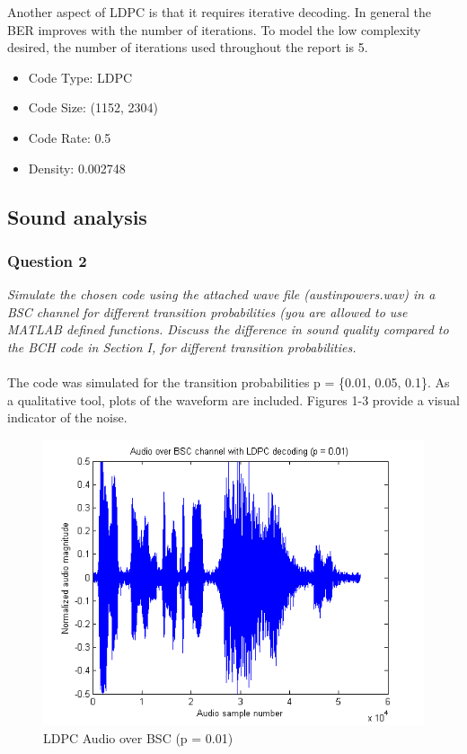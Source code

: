 \documentclass[a4paper]{article}
\begin{document}
Another aspect of LDPC is that it requires iterative decoding. In general the BER improves with the number of iterations. To model the low complexity desired, the number of iterations used throughout the report is 5.

\begin{itemize}
\item Code Type: LDPC
\item Code Size: (1152, 2304)
\item Code Rate: 0.5
\item Density:  0.002748
\end{itemize}

\subsection{Sound analysis}

\subsubsection{Question 2} \textit{Simulate the chosen code using the attached wave file (austinpowers.wav) in a BSC channel for different transition probabilities (you are allowed to use MATLAB defined functions. Discuss the difference in sound quality compared to the BCH code in Section I, for different transition probabilities.}\\
\\


The code was simulated for the transition probabilities p = \{0.01, 0.05, 0.1\}. As a qualitative tool, plots of the waveform are included. Figures 1-3 provide a visual indicator of the noise. \\

\begin{figure}[H]
\centering
\includegraphics[scale=0.5]{plots/audio_over_bsc_ldpc_p_001.png}
\caption{LDPC Audio over BSC (p = 0.01)}
\end{figure}
\end{document}
